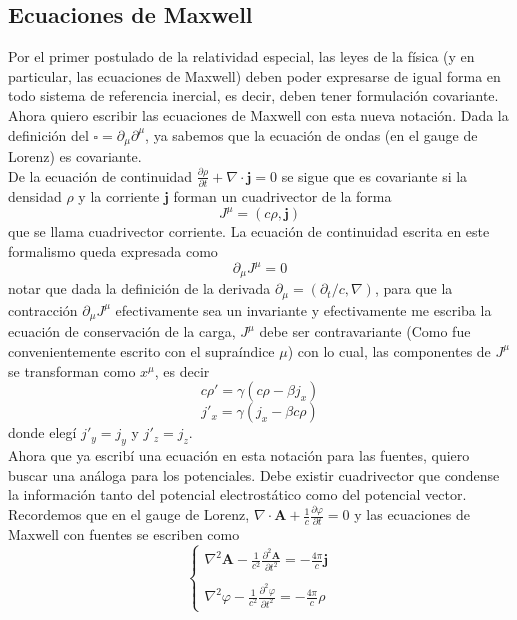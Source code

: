 \subsection{Ecuaciones de Maxwell} 
Por el primer postulado de la relatividad especial, las leyes de la física (y en particular, las ecuaciones de Maxwell) deben poder expresarse de igual forma en todo sistema de referencia inercial, es decir, deben tener formulación covariante.\\
\indent Ahora quiero escribir las ecuaciones de Maxwell con esta nueva notación. Dada la definición del $\square = \partial_{\mu}\partial^{\mu}$, ya sabemos que la ecuación de ondas (en el gauge de Lorenz) es covariante.\\
\indent De la ecuación de continuidad $\frac{\partial \rho}{\partial t} + \nabla \cdot \textbf{j} = 0$ se sigue que es covariante si la densidad $\rho$ y la corriente $\textbf{j}$ forman un cuadrivector de la forma
\begin{equation*}
    J^{\mu} = (c\rho, \textbf{j})
\end{equation*}
que se llama cuadrivector corriente. La ecuación de continuidad escrita en este formalismo queda expresada como
\begin{equation*}
    \partial_{\mu}J^{\mu} = 0
\end{equation*}
notar que dada la definición de la derivada $\partial_{\mu} = (\partial_{t}/c, \nabla)$, para que la contracción $\partial_{\mu}J^{\mu}$ efectivamente sea un invariante y efectivamente me escriba la ecuación de conservación de la carga, $J^{\mu}$ debe ser contravariante (Como fue convenientemente escrito con el supraíndice $\mu$) con lo cual, las componentes de $J^{\mu}$ se transforman como $x^{\mu}$, es decir
\begin{equation*}
    c\rho' = \gamma(c\rho - \beta j_{x})
\end{equation*}
\begin{equation*}
    j'_{x} = \gamma(j_{x} - \beta c \rho)
\end{equation*}
donde elegí $j'_{y} = j_{y}$ y $j'_{z} = j_{z}$.\\
\indent Ahora que ya escribí una ecuación en esta notación para las fuentes, quiero buscar una análoga para los potenciales. Debe existir cuadrivector que condense la información tanto del potencial electrostático como del potencial vector. Recordemos que en el gauge de Lorenz, $\nabla \cdot \textbf{A} + \frac{1}{c}\frac{\partial \varphi}{\partial t} = 0$ y las ecuaciones de Maxwell con fuentes se escriben como 
\begin{equation*}
    \left\{
        \begin{matrix}
            \nabla^{2}\textbf{A} - \frac{1}{c^{2}}\frac{\partial^{2}\textbf{A}}{\partial t^{2}}
            = -\frac{4\pi}{c}\textbf{j}\\
            \\
            \nabla^{2}\varphi - \frac{1}{c^{2}}\frac{\partial^{2}\varphi}{\partial t^{2}}
            = -\frac{4\pi}{c}\rho
        \end{matrix}
    \right.
\end{equation*}
